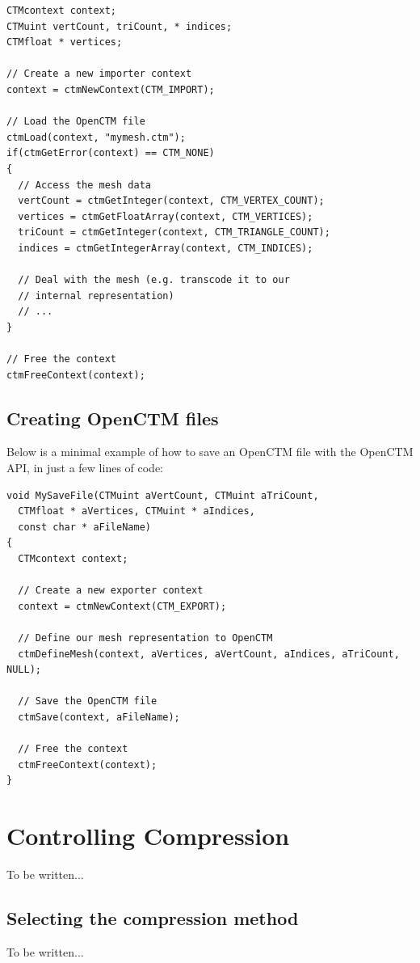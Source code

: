 \begin{lstlisting}
CTMcontext context;
CTMuint vertCount, triCount, * indices;
CTMfloat * vertices;

// Create a new importer context
context = ctmNewContext(CTM_IMPORT);

// Load the OpenCTM file
ctmLoad(context, "mymesh.ctm");
if(ctmGetError(context) == CTM_NONE)
{
  // Access the mesh data
  vertCount = ctmGetInteger(context, CTM_VERTEX_COUNT);
  vertices = ctmGetFloatArray(context, CTM_VERTICES);
  triCount = ctmGetInteger(context, CTM_TRIANGLE_COUNT);
  indices = ctmGetIntegerArray(context, CTM_INDICES);

  // Deal with the mesh (e.g. transcode it to our
  // internal representation)
  // ...
}

// Free the context
ctmFreeContext(context);
\end{lstlisting}


\section{Creating OpenCTM files}
Below is a minimal example of how to save an OpenCTM file with the OpenCTM API,
in just a few lines of code:

\begin{lstlisting}
void MySaveFile(CTMuint aVertCount, CTMuint aTriCount,
  CTMfloat * aVertices, CTMuint * aIndices,
  const char * aFileName)
{
  CTMcontext context;

  // Create a new exporter context
  context = ctmNewContext(CTM_EXPORT);

  // Define our mesh representation to OpenCTM
  ctmDefineMesh(context, aVertices, aVertCount, aIndices, aTriCount, NULL);

  // Save the OpenCTM file
  ctmSave(context, aFileName);

  // Free the context
  ctmFreeContext(context);
}
\end{lstlisting}




\chapter{Controlling Compression}
To be written...


\section{Selecting the compression method}
To be written...


